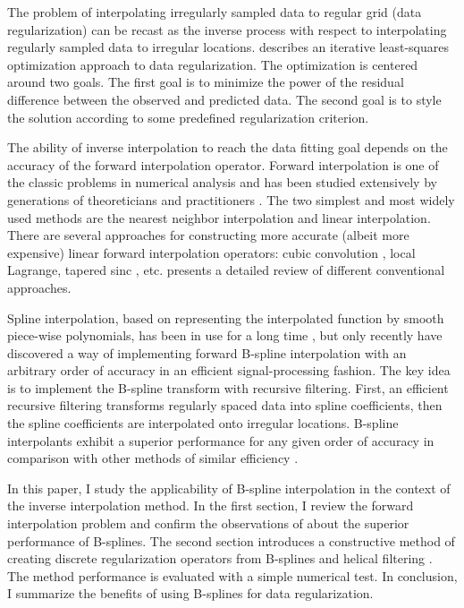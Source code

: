 The problem of interpolating irregularly sampled data to regular grid
(data regularization) can be recast as the inverse process with
respect to interpolating regularly sampled data to irregular
locations.   describes an iterative least-squares
optimization approach to data regularization. The optimization is
centered around two goals. The first goal is to minimize the power of
the residual difference between the observed and predicted data. The
second goal is to style the solution according to some predefined
regularization criterion.
\par
The ability of inverse interpolation to reach the data fitting goal
depends on the accuracy of the forward interpolation operator. Forward
interpolation is one of the classic problems in numerical analysis and
has been studied extensively by generations of theoreticians and
practitioners \cite{Fomel.sep.94.sergey2}. The two simplest and most
widely used methods are the nearest neighbor interpolation and linear
interpolation.  There are several approaches for constructing more
accurate (albeit more expensive) linear forward interpolation
operators: cubic convolution \cite{keys}, local Lagrange, tapered sinc
\cite{Harlan.sep.30.103}, etc.  presents a detailed
review of different conventional approaches.
\par
Spline interpolation, based on representing the interpolated function
by smooth piece-wise polynomials, has been in use for a long time
\cite{deBoor}, but only recently  have
discovered a way of implementing forward B-spline interpolation with
an arbitrary order of accuracy in an efficient signal-processing
fashion. The key idea is to implement the B-spline transform with
recursive filtering. First, an efficient recursive filtering
transforms regularly spaced data into spline coefficients, then the
spline coefficients are interpolated onto irregular locations.
B-spline interpolants exhibit a superior performance for any given
order of accuracy in comparison with other methods of similar
efficiency \cite{handbook}.
\par
In this paper, I study the applicability of B-spline interpolation in
the context of the inverse interpolation method. In the first section,
I review the forward interpolation problem and confirm the
observations of  about the superior performance of
B-splines. The second section introduces a constructive method of
creating discrete regularization operators from B-splines and helical
filtering \cite{Claerbout.geo.98}. The method performance is evaluated
with a simple numerical test. In conclusion, I summarize the benefits
of using B-splines for data regularization.

